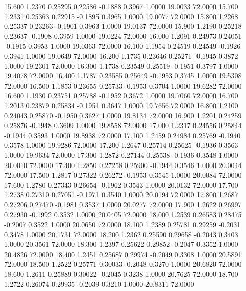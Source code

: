   15.600   1.2370   0.25295   0.22586  -0.1888   0.3967   1.0000  19.0033  72.0000
  15.700   1.2331   0.25363   0.22915  -0.1895   0.3965   1.0000  19.0077  72.0000
  15.800   1.2268   0.25337   0.23263  -0.1901   0.3963   1.0000  19.0137  72.0000
  15.900   1.2190   0.25218   0.23637  -0.1908   0.3959   1.0000  19.0224  72.0000
  16.000   1.2091   0.24973   0.24051  -0.1915   0.3953   1.0000  19.0363  72.0000
  16.100   1.1954   0.24519   0.24549  -0.1926   0.3941   1.0000  19.0649  72.0000
  16.200   1.1735   0.23646   0.25271  -0.1945   0.3872   1.0000  19.2301  72.0000
  16.300   1.1738   0.23549   0.25519  -0.1951   0.3797   1.0000  19.4078  72.0000
  16.400   1.1787   0.23585   0.25649  -0.1953   0.3745   1.0000  19.5308  72.0000
  16.500   1.1853   0.23655   0.25733  -0.1953   0.3704   1.0000  19.6282  72.0000
  16.600   1.1930   0.23751   0.25788  -0.1952   0.3672   1.0000  19.7060  72.0000
  16.700   1.2013   0.23879   0.25834  -0.1951   0.3647   1.0000  19.7656  72.0000
  16.800   1.2100   0.24043   0.25870  -0.1950   0.3627   1.0000  19.8134  72.0000
  16.900   1.2201   0.24259   0.25876  -0.1948   0.3609   1.0000  19.8558  72.0000
  17.000   1.2317   0.24556   0.25844  -0.1944   0.3593   1.0000  19.8938  72.0000
  17.100   1.2459   0.24984   0.25769  -0.1940   0.3578   1.0000  19.9286  72.0000
  17.200   1.2647   0.25714   0.25625  -0.1936   0.3563   1.0000  19.9634  72.0000
  17.300   1.2872   0.27144   0.25538  -0.1936   0.3548   1.0000  20.0010  72.0000
  17.400   1.2850   0.27258   0.25900  -0.1944   0.3546   1.0000  20.0044  72.0000
  17.500   1.2817   0.27322   0.26272  -0.1953   0.3545   1.0000  20.0084  72.0000
  17.600   1.2780   0.27343   0.26654  -0.1962   0.3543   1.0000  20.0132  72.0000
  17.700   1.2738   0.27310   0.27051  -0.1971   0.3540   1.0000  20.0194  72.0000
  17.800   1.2687   0.27206   0.27470  -0.1981   0.3537   1.0000  20.0277  72.0000
  17.900   1.2622   0.26997   0.27930  -0.1992   0.3532   1.0000  20.0405  72.0000
  18.000   1.2539   0.26583   0.28475  -0.2007   0.3522   1.0000  20.0650  72.0000
  18.100   1.2389   0.25781   0.29259  -0.2031   0.3478   1.0000  20.1731  72.0000
  18.200   1.2362   0.25590   0.29658  -0.2043   0.3403   1.0000  20.3561  72.0000
  18.300   1.2397   0.25622   0.29852  -0.2047   0.3352   1.0000  20.4826  72.0000
  18.400   1.2451   0.25687   0.29974  -0.2049   0.3308   1.0000  20.5891  72.0000
  18.500   1.2522   0.25771   0.30033  -0.2048   0.3270   1.0000  20.6820  72.0000
  18.600   1.2611   0.25889   0.30022  -0.2045   0.3238   1.0000  20.7625  72.0000
  18.700   1.2722   0.26074   0.29935  -0.2039   0.3210   1.0000  20.8311  72.0000
